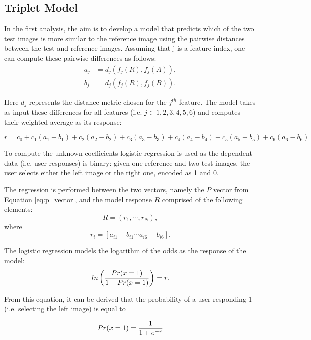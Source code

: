 \subsection{Triplet Model}
In the first analysis, the aim is to develop a model that predicts which of the two test images is more similar to the reference image using the pairwise distances between the test and reference images. Assuming that j is a feature index, one can compute these pairwise differences as follows:
\begin{align}
    a_j &= d_j(f_j(R), f_j(A)), \\
   b_j &= d_j(f_j(R), f_j(B)). 
\end{align}

Here $d_j$ represents the distance metric chosen for the $j^{th}$ feature. The model takes as input these differences for all features (i.e. $j \in {1, 2, 3, 4, 5, 6}$) and computes their weighted average as its response:

\begin{equation}
    r = c_0 + c_1(a_1 - b_1) + c_2(a_2 - b_2) + c_3(a_3 - b_3)+ c_4(a_4 - b_4) + c_5(a_5 - b_5) + c_6(a_6 - b_6)
\end{equation}
 

To compute the unknown coefficients logistic regression is used as the dependent data (i.e. user responses)
is binary: given one reference and two test images, the user selects either the left image or the right one,
encoded as 1 and 0.

The regression is performed between the two vectors, namely the $P$ vector from Equation \ref{eq:p_vector}, and the model response $R$ comprised of the following elements:
\begin{equation}
    R = (r_1,\cdots, r_N ),
\end{equation}
where
\begin{equation}
    r_i = [a_{i1} - b_{i1} \cdots a_{i6} - b_{i6}].
\end{equation}

The logistic regression models the logarithm of the odds as the response of the model:
\begin{equation}
   ln \left( {{Pr(x = 1)} \over { 1 - Pr(x = 1)}} \right) = r. 
\end{equation}


From this equation, it can be derived that the probability of a user responding 1 (i.e. selecting the left image) is equal to

\begin{equation}
\label{eq:response_prob}
    Pr(x = 1) = {{1} \over {1 + e^{-r}}}
\end{equation}

